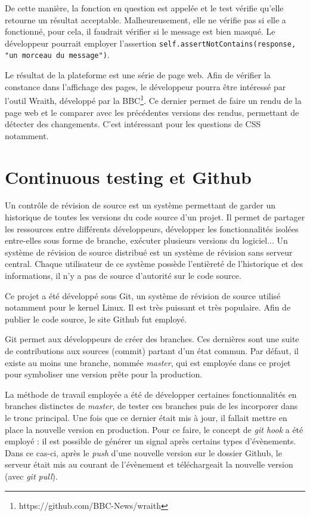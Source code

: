 \documentclass[a4paper,12pt]{article}
\begin{document}
De cette manière, la fonction en question est appelée et le test vérifie qu'elle
retourne un résultat acceptable. Malheureusement, elle ne vérifie pas si elle a fonctionné,
pour cela, il faudrait vérifier si le message est bien masqué. Le développeur pourrait
employer l'assertion \texttt{self.assertNotContains(response, "un morceau du message")}.

Le résultat de la plateforme est une série de page web. Afin de vérifier la constance
dans l'affichage des pages, le développeur pourra être intéressé par l'outil Wraith,
développé par la BBC\footnote{https://github.com/BBC-News/wraith}. Ce dernier
permet de faire un rendu de la page web et le comparer avec les précédentes versions
des rendus, permettant de détecter des changements. C'est intéressant pour les
questions de CSS notamment.


\section{Continuous testing et Github}

Un contrôle de révision de source est un système permettant de garder un historique
de toutes les versions du code source d'un projet. Il permet de partager les ressources
entre différents développeurs, développer les fonctionnalités isolées entre-elles sous
forme de branche, exécuter plusieurs versions du logiciel... Un système de révision
de source distribué est un système de révision sans serveur central. Chaque
utilisateur de ce système possède l'entièreté de l'historique et des informations,
il n'y a pas de source d'autorité sur le code source.

Ce projet a été développé sous Git, un système de révision de source utilisé notamment
pour le kernel Linux. Il est très puissant et très populaire. Afin de publier le code
source, le site Github fut employé.

Git permet aux développeurs de créer des branches. Ces dernières sont une suite de
contributions aux sources (commit) partant d'un état commun. Par défaut, il existe
au moins une branche, nommée \textit{master}, qui est employée dans ce projet
pour symboliser une version prête pour la production.

La méthode de travail employée a été de développer certaines fonctionnalités en branches
distinctes de \textit{master}, de tester ces branches puis de les incorporer dans
le tronc principal. Une fois que ce dernier était mis à jour, il fallait mettre en
place la nouvelle version en production. Pour ce faire, le concept de \textit{git hook}
a été employé : il est possible de générer un signal après certains types d'évènements.
Dans ce cas-ci, après le \textit{push} d'une nouvelle version sur le dossier Github,
le serveur était mis au courant de l'évènement et téléchargeait la nouvelle version (avec
\textit{git pull}).
\end{document}
